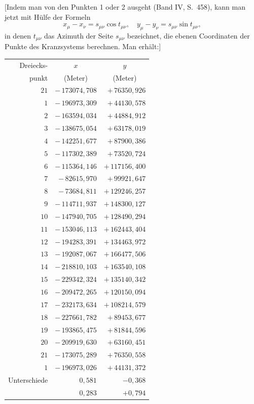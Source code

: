 \documentclass[12pt,a4paper]{article}
\theoremstyle{plain}
\theoremstyle{definition}
\theoremstyle{remark}
\begin{document}
[Indem man von den Punkten 1 oder 2 ausgeht (Band IV, S.\ 458), kann man jetzt mit H\"ulfe der Formeln
\[x_\mu - x_\nu = s_{\mu\nu} \cos t_{\mu\nu}, \quad y_\mu - y_\nu = s_{\mu\nu} \sin t_{\mu\nu},\]
in denen $t_{\mu\nu}$ das Azimuth der Seite $s_{\mu\nu}$ bezeichnet, die ebenen Coordinaten der Punkte des Kranzsystems berechnen. Man erh\"alt:]

\begin{center}
\begin{tabular}{r|r|r}
Dreiecks- & \multicolumn{1}{c|}{$x$} & \multicolumn{1}{c}{$y$}\\
punkt & \multicolumn{1}{c|}{(Meter)} & \multicolumn{1}{c}{(Meter)}\\
\hline
$21$ & $-\,173074{,}708$ & $+\,76350{,}926$\\
$1$ & $-\,196973{,}309$ & $+\,44130{,}578$\\
$2$ & $-\,163594{,}034$ & $+\,44884{,}912$\\
$3$ & $-\,138675{,}054$ & $+\,63178{,}019$\\
$4$ & $-\,142251{,}677$ & $+\,87900{,}386$\\
$5$ & $-\,117302{,}389$ & $+\,73520{,}724$\\
$6$ & $-\,115364{,}146$ & $+\,117156{,}400$\\
$7$ & $-\,82615{,}970$ & $+\,99921{,}647$\\
$8$ & $-\,73684{,}811$ & $+\,129246{,}257$\\
$9$ & $-\,114711{,}937$ & $+\,148300{,}127$\\
$10$ & $-\,147940{,}705$ & $+\,128490{,}294$\\
$11$ & $-\,153046{,}113$ & $+\,162443{,}404$\\
$12$ & $-\,194283{,}391$ & $+\,134463{,}972$\\
$13$ & $-\,192087{,}067$ & $+\,166477{,}506$\\
$14$ & $-\,218810{,}103$ & $+\,163540{,}108$\\
$15$ & $-\,229342{,}324$ & $+\,135140{,}342$\\
$16$ & $-\,209472{,}265$ & $+\,120150{,}094$\\
$17$ & $-\,232173{,}634$ & $+\,108214{,}579$\\
$18$ & $-\,227661{,}782$ & $+\,89453{,}677$\\
$19$ & $-\,193865{,}475$ & $+\,81844{,}596$\\
$20$ & $-\,209919{,}630$ & $+\,63160{,}451$\\
$21$ & $-\,173075{,}289$ & $+\,76350{,}558$\\
$1$ & $-\,196973{,}026$ & $+\,44131{,}372$\\
\hline
\multicolumn{1}{r|}{Unterschiede} & $0{,}581$ & $-0{,}368$\\
 & $0{,}283$ & $+0{,}794$
\end{tabular}
\end{center}
\end{document}

